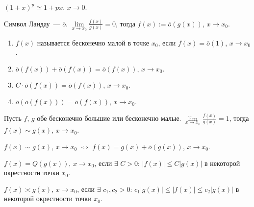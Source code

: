 \documentclass{article}
\begin{document}
	\begin{statement}
		$(1 + x)^p \simeq 1 + px$, $x \rightarrow 0$.
	\end{statement}
	\begin{definition}
		Символ Ландау~--- $\overline{o}$. $\lim\limits_{x \rightarrow x_0} \frac{f(x)}{g(x)} = 0$, тогда $f(x) := \overline{o}(g(x))$, $x \rightarrow x_0$.
	\end{definition}
	\begin{property}
		\begin{enumerate}
			\item $f(x)$ называется бесконечно малой в точке $x_0$, если $f(x) = \overline{o}(1)$, $x \rightarrow x_0$.
			\item $\overline{o}(f(x)) + \overline{o}(f(x)) = \overline{o}(f(x))$, $x \rightarrow x_0$.
			\item $C \cdot \overline{o}(f(x)) = \overline{o}(f(x))$, $x \rightarrow x_0$.
			\item $\overline{o}(\overline{o}(f(x))) = \overline{o}(f(x))$, $x \rightarrow x_0$.
		\end{enumerate}
	\end{property}
	\begin{definition}
		Пусть $f$, $g$ обе бесконечно большие или бесконечно малые. $\lim\limits_{x \rightarrow x_0} \frac{f(x)}{g(x)} = 1$, тогда $f(x) \sim g(x)$, $x \rightarrow x_0$.
	\end{definition}
	\begin{statement}
		$f(x) \sim g(x)$, $x \rightarrow x_0$ $\Leftrightarrow$ $f(x) = g(x) + \overline{o}(g(x))$, $x \rightarrow x_0$.
	\end{statement}
	\begin{definition}
		$f(x) = \underline{O}(g(x))$, $x \rightarrow x_0$, если $\exists$ $C > 0$: $|f(x)| \leqslant C|g(x)|$ в некоторой окрестности точки $x_0$.
	\end{definition}
	\begin{definition}
		$f(x) \asymp g(x)$, $x \rightarrow x_0$, если $\exists$ $c_1, c_2 > 0$: $c_1|g(x)| \leqslant |f(x)| \leqslant c_2|g(x)|$ в некоторой окрестности точки $x_0$.
	\end{definition}
\end{document}
